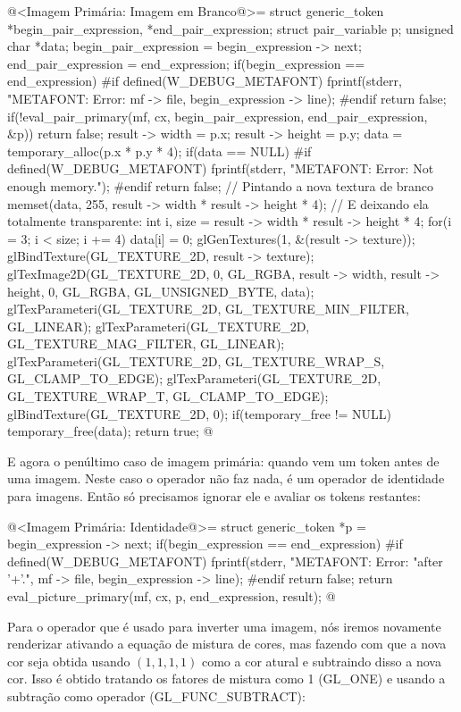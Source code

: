 {\iniciocodigo
@<Imagem Primária: Imagem em Branco@>=
struct generic_token *begin_pair_expression, *end_pair_expression;
struct pair_variable p;
unsigned char *data;
begin_pair_expression = begin_expression -> next;
end_pair_expression = end_expression;
if(begin_expression == end_expression){
#if defined(W_DEBUG_METAFONT)
  fprintf(stderr, "METAFONT: Error: %
          mf -> file, begin_expression -> line);
#endif
  return false;
}
if(!eval_pair_primary(mf, cx, begin_pair_expression, end_pair_expression, &p))
  return false;
result -> width = p.x;
result -> height = p.y;
data = temporary_alloc(p.x * p.y * 4);
if(data == NULL){
#if defined(W_DEBUG_METAFONT)
  fprintf(stderr, "METAFONT: Error: Not enough memory.\n");
#endif
  return false;
}
// Pintando a nova textura de branco
memset(data, 255, result -> width * result -> height * 4);
{ // E deixando ela totalmente transparente:
  int i, size = result -> width * result -> height * 4;
  for(i = 3; i < size; i += 4)
    data[i] = 0;
}
glGenTextures(1, &(result -> texture));
glBindTexture(GL_TEXTURE_2D, result -> texture);
glTexImage2D(GL_TEXTURE_2D, 0, GL_RGBA, result -> width, result -> height, 0,
             GL_RGBA, GL_UNSIGNED_BYTE, data);
glTexParameteri(GL_TEXTURE_2D, GL_TEXTURE_MIN_FILTER, GL_LINEAR);
glTexParameteri(GL_TEXTURE_2D, GL_TEXTURE_MAG_FILTER, GL_LINEAR);
glTexParameteri(GL_TEXTURE_2D, GL_TEXTURE_WRAP_S, GL_CLAMP_TO_EDGE);
glTexParameteri(GL_TEXTURE_2D, GL_TEXTURE_WRAP_T, GL_CLAMP_TO_EDGE);
glBindTexture(GL_TEXTURE_2D, 0);
if(temporary_free != NULL)
  temporary_free(data);
return true;
@
\fimcodigo

E agora o penúltimo caso de imagem primária: quando vem um
token \monoespaco{+} antes de uma imagem. Neste caso o operador não faz
nada, é um operador de identidade para imagens. Então só precisamos
ignorar ele e avaliar os tokens restantes:

\iniciocodigo
@<Imagem Primária: Identidade@>=
struct generic_token *p = begin_expression -> next;
if(begin_expression == end_expression){
#if defined(W_DEBUG_METAFONT)
  fprintf(stderr, "METAFONT: Error: %
                  "after '+'.\n", mf -> file, begin_expression -> line);
#endif
  return false;
}
return eval_picture_primary(mf, cx, p, end_expression, result);
@
\fimcodigo

Para o operador \monoespaco{-} que é usado para inverter uma imagem,
nós iremos novamente renderizar ativando a equação de mistura de
cores, mas fazendo com que a nova cor seja obtida usando $(1, 1, 1,
1)$ como a cor atural e subtraindo disso a nova cor. Isso é obtido
tratando os fatores de mistura como 1 (GL\_ONE) e usando a subtração
como operador (GL\_FUNC\_SUBTRACT):


}

